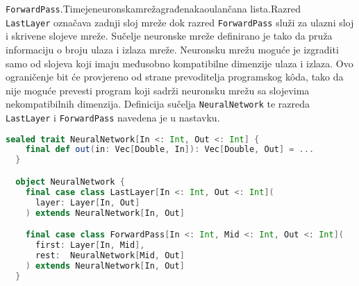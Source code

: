 \texttt{ForwardPass}.\hfill{}Time\hfill{}je\hfill{}neuronska\hfill{}mreža\hfill{}građena\hfill{}kao\hfill{}ulančana
\hfill{}lista.\hfill{}Razred\\
\texttt{LastLayer} označava zadnji sloj mreže dok razred \texttt{ForwardPass} služi za ulazni
sloj i skrivene slojeve mreže. Sučelje neuronske mreže definirano je tako da pruža informaciju o broju ulaza i izlaza
mreže. Neuronsku mrežu moguće je izgraditi samo od slojeva koji imaju međusobno kompatibilne dimenzije ulaza i izlaza.
Ovo ograničenje bit će provjereno od strane prevoditelja programskog kôda, tako da nije moguće prevesti program koji
sadrži neuronsku mrežu sa slojevima nekompatibilnih dimenzija. Definicija sučelja \texttt{NeuralNetwork} te razreda
\texttt{LastLayer} i \texttt{ForwardPass} navedena je u nastavku.
\begin{lstlisting}[language=scala,label={lst:lstlisting7}]
  sealed trait NeuralNetwork[In <: Int, Out <: Int] {
    final def out(in: Vec[Double, In]): Vec[Double, Out] = ...
  }

  object NeuralNetwork {
    final case class LastLayer[In <: Int, Out <: Int](
      layer: Layer[In, Out]
    ) extends NeuralNetwork[In, Out]

    final case class ForwardPass[In <: Int, Mid <: Int, Out <: Int](
      first: Layer[In, Mid],
      rest:  NeuralNetwork[Mid, Out]
    ) extends NeuralNetwork[In, Out]
  }
\end{lstlisting}

